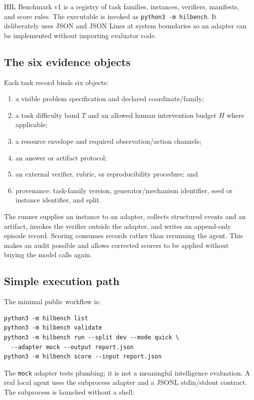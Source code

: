 \documentclass[11pt]{article}
\theoremstyle{definition}
\begin{document}
HIL Benchmark v1 is a registry of task families, instances, verifiers, manifests, and score rules. The executable is invoked as \texttt{python3 -m hilbench}. It deliberately uses JSON and JSON Lines at system boundaries so an adapter can be implemented without importing evaluator code.

\subsection{The six evidence objects}

Each task record binds six objects:

\begin{enumerate}
\item a visible problem specification and declared coordinate/family;
\item a task difficulty band $T$ and an allowed human intervention budget $H$ where applicable;
\item a resource envelope and required observation/action channels;
\item an answer or artifact protocol;
\item an external verifier, rubric, or reproducibility procedure; and
\item provenance: task-family version, generator/mechanism identifier, seed or instance identifier, and split.
\end{enumerate}

The runner supplies an instance to an adapter, collects structured events and an artifact, invokes the verifier outside the adapter, and writes an append-only episode record. Scoring consumes records rather than rerunning the agent. This makes an audit possible and allows corrected scorers to be applied without buying the model calls again.

\subsection{Simple execution path}

The minimal public workflow is:

\begin{verbatim}
python3 -m hilbench list
python3 -m hilbench validate
python3 -m hilbench run --split dev --mode quick \
  --adapter mock --output report.json
python3 -m hilbench score --input report.json
\end{verbatim}

The \texttt{mock} adapter tests plumbing; it is not a meaningful intelligence evaluation. A real local agent uses the subprocess adapter and a JSONL stdin/stdout contract. The subprocess is launched without a shell:
\end{document}
